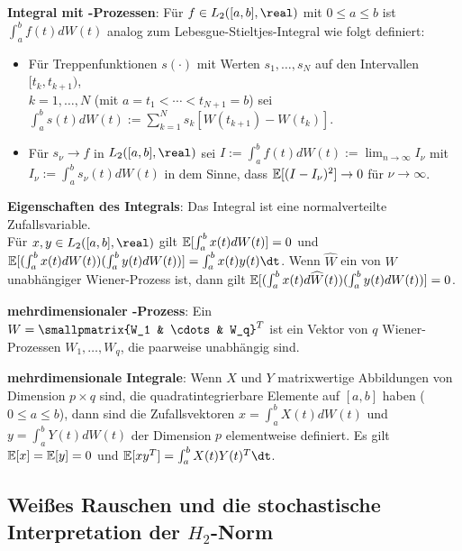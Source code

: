 \linie
\pagebreak

\textbf{Integral mit -Prozessen}:
Für $f \in L_2([a, b], \real)$ mit $0 \le a \le b$ ist
$\int_a^b f(t) dW(t)$ analog zum Lebesgue-Stieltjes-Integral wie folgt definiert:
\begin{itemize}
    \item
    Für Treppenfunktionen $s(\cdot)$ mit Werten $s_1, \dotsc, s_N$ auf den Intervallen
    $[t_k, t_{k+1})$,\\
    $k = 1, \dotsc, N$ (mit $a = t_1 < \dotsb < t_{N+1} = b$) sei
    $\int_a^b s(t) dW(t) := \sum_{k=1}^N s_k [W(t_{k+1}) - W(t_k)]$.

    \item
    Für $s_\nu \to f$ in $L_2([a, b], \real)$ sei
    $I := \int_a^b f(t) dW(t) := \lim_{n \to \infty} I_\nu$ mit $I_\nu := \int_a^b s_\nu(t) dW(t)$
    in dem Sinne, dass $\mathbb{E}[(I - I_\nu)^2] \to 0$ für $\nu \to \infty$.
\end{itemize}

\textbf{Eigenschaften des Integrals}:
Das Integral ist eine normalverteilte Zufallsvariable.\\
Für $x, y \in L_2([a, b], \real)$ gilt
$\mathbb{E}[\int_a^b x(t) dW(t)] = 0$ und\\
$\EE[(\int_a^b x(t) dW(t)) (\int_a^b y(t) dW(t))] = \int_a^b x(t) y(t) \dt$.
Wenn $\widehat{W}$ ein von $W$ unabhängiger Wiener-Prozess ist, dann gilt
$\mathbb{E}[(\int_a^b x(t) d\widehat{W}(t)) (\int_a^b y(t) dW(t))] = 0$.

\linie

\textbf{mehrdimensionaler -Prozess}:
Ein \\
$W = \smallpmatrix{W_1 & \cdots & W_q}^T$
ist ein Vektor von $q$ Wiener-Prozessen $W_1, \dotsc, W_q$, die paarweise unabhängig sind.

\textbf{mehrdimensionale Integrale}:
Wenn $X$ und $Y$ matrixwertige Abbildungen von Dimension $p \times q$ sind,
die quadratintegrierbare Elemente auf $[a, b]$ haben ($0 \le a \le b$), dann sind die
Zufallsvektoren $x = \int_a^b X(t) dW(t)$ und $y = \int_a^b Y(t) dW(t)$ der Dimension $p$
elementweise definiert.
Es gilt $\mathbb{E}[x] = \mathbb{E}[y] = 0$ und $\EE[xy^T] = \int_a^b X(t) Y(t)^T \dt$.

\subsection{%
    Weißes Rauschen und die stochastische Interpretation der \texorpdfstring{$H_2$-Norm}{H₂-Norm}%
}

